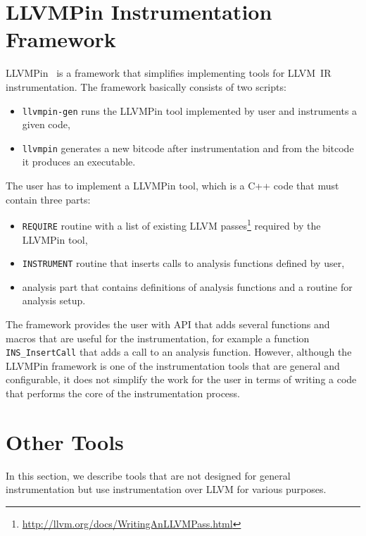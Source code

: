 \section{LLVMPin Instrumentation Framework}

LLVMPin~\cite{llvmpin} is a framework that simplifies implementing tools for
LLVM~IR instrumentation. The framework basically consists of two scripts:

\begin{itemize}
    \item \texttt{llvmpin-gen} runs the LLVMPin tool implemented by
          user and instruments a given code,
    \item \texttt{llvmpin} generates a new
	  bitcode after instrumentation and from the bitcode it produces an
          executable.
\end{itemize}

The user has to implement a LLVMPin tool, which is a C++ code that must contain three
parts:

\begin{itemize}
    \item \texttt{REQUIRE} routine with a list of existing LLVM
          passes\footnote{\url{http://llvm.org/docs/WritingAnLLVMPass.html}} required by
          the LLVMPin tool,
    \item \texttt{INSTRUMENT} routine that inserts calls to analysis functions
          defined by user,
    \item analysis part that contains definitions of analysis functions and a
          routine for analysis setup.
\end{itemize}

The framework provides the user with API that adds several functions and macros
that are useful for the instrumentation, for example a function
\texttt{INS\_InsertCall} that adds a call to an analysis function. However,
although the LLVMPin framework is one of the instrumentation tools that are
general and configurable, it does not simplify the work for the user in terms
of writing a code that performs the core of the instrumentation process.

\section{Other Tools}

In this section, we describe tools that are not designed for general
instrumentation but use instrumentation over LLVM for various purposes.

